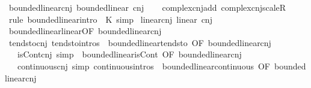 \begin{isabellebody}
\ bounded{\isacharunderscore}{\kern0pt}linear{\isacharunderscore}{\kern0pt}cnj{\isacharcolon}{\kern0pt}\ {\isachardoublequoteopen}bounded{\isacharunderscore}{\kern0pt}linear\ cnj{\isachardoublequoteclose}\isanewline
%
\isadelimproof
\ \ %
\endisadelimproof
%
\isatagproof
{}\isamarkupfalse%
\ complex{\isacharunderscore}{\kern0pt}cnj{\isacharunderscore}{\kern0pt}add\ complex{\isacharunderscore}{\kern0pt}cnj{\isacharunderscore}{\kern0pt}scaleR\ \isamarkupfalse%
\ {\isacharparenleft}{\kern0pt}rule\ bounded{\isacharunderscore}{\kern0pt}linear{\isacharunderscore}{\kern0pt}intro\ {\isacharbrackleft}{\kern0pt}\ K{\isacharequal}{\kern0pt}{}{\isacharbrackright}{\kern0pt}{\isacharparenright}{\kern0pt}\ simp%
\endisatagproof
{\isafoldproof}%
%
\isadelimproof
\isanewline
%
\endisadelimproof
\isanewline
{}\isamarkupfalse%
\ linear{\isacharunderscore}{\kern0pt}cnj{\isacharcolon}{\kern0pt}\ {\isachardoublequoteopen}linear\ cnj{\isachardoublequoteclose}\isanewline
%
\isadelimproof
\ \ %
\endisadelimproof
%
\isatagproof
{}\isamarkupfalse%
\ bounded{\isacharunderscore}{\kern0pt}linear{\isachardot}{\kern0pt}linear{\isacharbrackleft}{\kern0pt}OF\ bounded{\isacharunderscore}{\kern0pt}linear{\isacharunderscore}{\kern0pt}cnj{\isacharbrackright}{\kern0pt}\ \isacommand{{\isachardot}{\kern0pt}}\isamarkupfalse%
%
\endisatagproof
{\isafoldproof}%
%
\isadelimproof
\isanewline
%
\endisadelimproof
\isanewline
{}\isamarkupfalse%
\ tendsto{\isacharunderscore}{\kern0pt}cnj\ {\isacharbrackleft}{\kern0pt}tendsto{\isacharunderscore}{\kern0pt}intros{\isacharbrackright}{\kern0pt}\ {\isacharequal}{\kern0pt}\ bounded{\isacharunderscore}{\kern0pt}linear{\isachardot}{\kern0pt}tendsto\ {\isacharbrackleft}{\kern0pt}OF\ bounded{\isacharunderscore}{\kern0pt}linear{\isacharunderscore}{\kern0pt}cnj{\isacharbrackright}{\kern0pt}\isanewline
\ \ \ isCont{\isacharunderscore}{\kern0pt}cnj\ {\isacharbrackleft}{\kern0pt}simp{\isacharbrackright}{\kern0pt}\ {\isacharequal}{\kern0pt}\ bounded{\isacharunderscore}{\kern0pt}linear{\isachardot}{\kern0pt}isCont\ {\isacharbrackleft}{\kern0pt}OF\ bounded{\isacharunderscore}{\kern0pt}linear{\isacharunderscore}{\kern0pt}cnj{\isacharbrackright}{\kern0pt}\isanewline
\ \ \ continuous{\isacharunderscore}{\kern0pt}cnj\ {\isacharbrackleft}{\kern0pt}simp{\isacharcomma}{\kern0pt}\ continuous{\isacharunderscore}{\kern0pt}intros{\isacharbrackright}{\kern0pt}\ {\isacharequal}{\kern0pt}\ bounded{\isacharunderscore}{\kern0pt}linear{\isachardot}{\kern0pt}continuous\ {\isacharbrackleft}{\kern0pt}OF\ bounded{\isacharunderscore}{\kern0pt}linear{\isacharunderscore}{\kern0pt}cnj{\isacharbrackright}{\kern0pt}\isanewline

\end{isabellebody}
